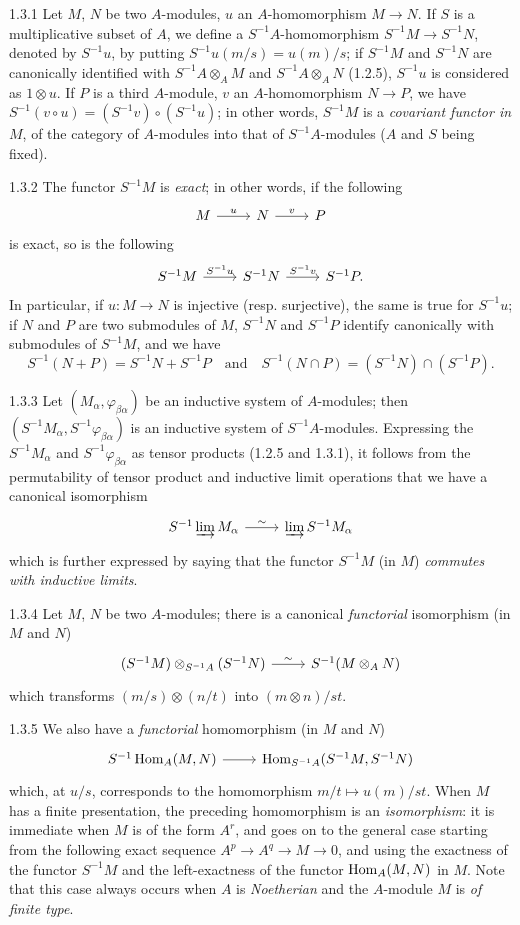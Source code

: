 \documentclass[../main.tex]{subfiles}
\begin{document}
\begin{cx}{1.3.1}
Let $M$, $N$ be two $A$-modules, $u$ an $A$-homomorphism $M\to N$. If $S$ is a multiplicative subset of $A$,
we define a $S^{-1}A$-homomorphism $S^{-1}M\to S^{-1}N$, denoted by $S^{-1}u$, by putting
$S^{-1}u(m/s)=u(m)/s$; if $S^{-1}M$ and $S^{-1}N$ are canonically identified with $S^{-1}A\otimes_A M$ and
$S^{-1}A\otimes_A N$ (1.2.5), $S^{-1}u$ is considered as $1\otimes u$. If $P$ is a third $A$-module,
$v$ an $A$-homomorphism $N\to P$, we have $S^{-1}(v\circ u)=(S^{-1}v)\circ(S^{-1}u)$; in other words,
$S^{-1}M$ is a \emph{covariant functor in} $M$, of the category of $A$-modules into that of $S^{-1}A$-modules
($A$ and $S$ being fixed).
\end{cx}

\begin{cx}{1.3.2}
The functor $S^{-1}M$ is \emph{exact}; in other words, if the following
\[\TI
  M\ar[r,"u"] & N\ar[r,"v"] & P
\TE\]
is exact, so is the following
\[\TI
  S^{-1}M\ar[r,"S^{-1}u"] & S^{-1}N\ar[r,"S^{-1}v"] & S^{-1}P.
\TE\]
In particular, if $u:M\to N$ is injective (resp. surjective), the same is true for $S^{-1}u$;
 if $N$ and $P$ are two
submodules of $M$, $S^{-1}N$ and $S^{-1}P$ identify canonically with submodules of $S^{-1}M$, and we have
\[
  S^{-1}(N+P)=S^{-1}N+S^{-1}P\quad\text{and}\quad S^{-1}(N\cap P)=(S^{-1}N)\cap(S^{-1}P).
\]
\end{cx}

\begin{cx}{1.3.3}
Let $(M_\alpha,\varphi_{\beta\alpha})$ be an inductive system of $A$-modules; then
$(S^{-1}M_\alpha,S^{-1}\varphi_{\beta\alpha})$ is an inductive system of $S^{-1}A$-modules.
Expressing the $S^{-1}M_\alpha$ and $S^{-1}\varphi_{\beta\alpha}$ as tensor products (1.2.5 and 1.3.1),
it follows from the permutability of tensor product and inductive limit operations that we have a canonical isomorphism
\[\TI
  S^{-1}\varinjlim M_\alpha\ar[r,"\sim"] &\varinjlim S^{-1} M_\alpha
\TE\]
which is further expressed by saying that the functor $S^{-1}M$ (in $M$) \emph{commutes with inductive limits}.
\end{cx}

\begin{cx}{1.3.4}
Let $M$, $N$ be two $A$-modules; there is a canonical \emph{functorial} isomorphism (in $M$ and $N$)
\[\TI
  (S^{-1}M)\otimes_{S^{-1}A}(S^{-1}N)\ar[r,"\sim"] &S^{-1}(M\otimes_A N)
\TE\]
which transforms $(m/s)\otimes(n/t)$ into $(m\otimes n)/st$.
\end{cx}

\begin{cx}{1.3.5}
We also have a \emph{functorial} homomorphism (in $M$ and $N$)
\[\TI
  S^{-1}\Hom_A(M,N)\ar[r] &\Hom_{S^{-1}A}(S^{-1}M,S^{-1}N)
\TE\]
which, at $u/s$, corresponds to the homomorphism $m/t\mapsto u(m)/st$. When $M$ has a finite presentation, the
preceding homomorphism is an \emph{isomorphism}: it is immediate when $M$ is of the form $A^r$, and goes on to the general
case starting from the following exact sequence $A^p\to A^q\to M\to 0$, and using the exactness of the functor $S^{-1}M$ and
the left-exactness of the functor $\operatorname*{Hom}_A(M,N)$ in $M$. Note that this case always occurs when $A$ is \emph{Noetherian} and the
$A$-module $M$ is \emph{of finite type}.
\end{cx}
\end{document}

